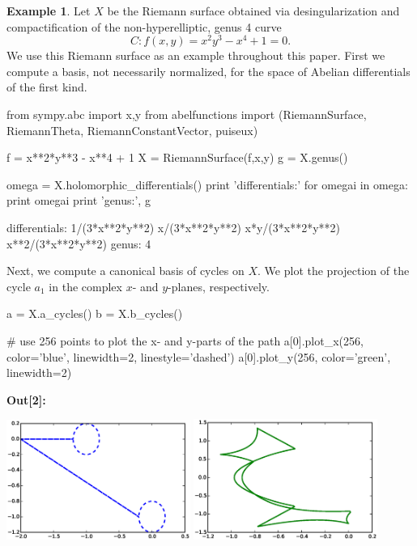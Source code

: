 \documentclass[12pt]{article}
\theoremstyle{definition}
\newtheorem{example}[theorem]{Example}
\begin{document}
\begin{example} \label{ex:riemannsurface} %
Let $X$ be the Riemann surface obtained via desingularization and
compactification of the non-hyperelliptic, genus 4 curve
\begin{equation}
  C: f(x,y) = x^2y^3 - x^4 + 1 = 0.
\end{equation}
We use this Riemann surface as an example throughout this paper. First
we compute a basis, not necessarily normalized, for the space of Abelian
differentials of the first kind.
\begin{ipythoninput}
from sympy.abc import x,y
from abelfunctions import (RiemannSurface, RiemannTheta,
                           RiemannConstantVector, puiseux)

f = x**2*y**3 - x**4 + 1
X = RiemannSurface(f,x,y)
g = X.genus()

omega = X.holomorphic_differentials()
print 'differentials:'
for omegai in omega:
    print omegai
print 'genus:', g
\end{ipythoninput}
\begin{ipythonoutput}
differentials:
1/(3*x**2*y**2)
x/(3*x**2*y**2)
x*y/(3*x**2*y**2)
x**2/(3*x**2*y**2)
genus: 4
\end{ipythonoutput}
Next, we compute a canonical basis of cycles on $X$. We plot the
projection of the cycle $a_1$ in the complex $x$- and $y$-planes,
respectively.
\begin{ipythoninput}
a = X.a_cycles()
b = X.b_cycles()

# use 256 points to plot the x- and y-parts of the path
a[0].plot_x(256, color='blue', linewidth=2, linestyle='dashed')
a[0].plot_y(256, color='green', linewidth=2)
\end{ipythoninput}
\vspace{-12pt}
\begin{ipythonoutput}
\end{ipythonoutput}
\hspace{2pt} {\footnotesize\bf\ttfamily Out[2]:}

\includegraphics[width=0.45\textwidth]{a1x.eps}
\includegraphics[width=0.45\textwidth]{a1y.eps}


\end{example}
\end{document}
